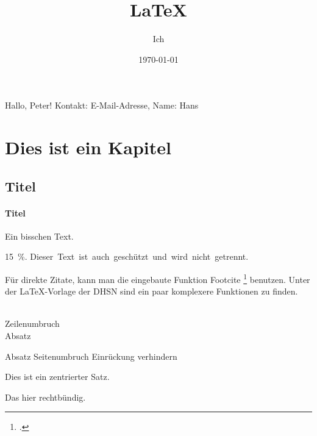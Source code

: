 \documentclass[a4paper, 12pt]{article}
\title{LaTeX}
\author{Ich}
\date{\today}
\newcommand{\gruss}[1]{Hallo, #1!}
\newcommand{\email}[2][E-Mail-Adresse]{Kontakt: #1, Name: #2}
\begin{document}
\gruss{Peter} %
\email{Hans} %

\maketitle
\tableofcontents %

\section{Dies ist ein Kapitel} %
\subsection{Titel} %
\paragraph{Titel} %


Ein bisschen Text.

15~\%. %
\mbox{Dieser Text ist auch geschützt und wird nicht getrennt.}

Für direkte Zitate, kann man die eingebaute Funktion Footcite \footcite[2]{psgithub} benutzen.
Unter der LaTeX-Vorlage der DHSN sind ein paar komplexere Funktionen zu finden.

\\          Zeilenumbruch
\\[0,5cm]   Absatz
\par        Absatz
\newpage    Seitenumbruch
\noindent   Einrückung verhindern

\begin{center}
\end{center}

{\centering Dies ist ein zentrierter Satz.\par}
{\raggedleft Das hier rechtbündig. \par}
\end{document}
